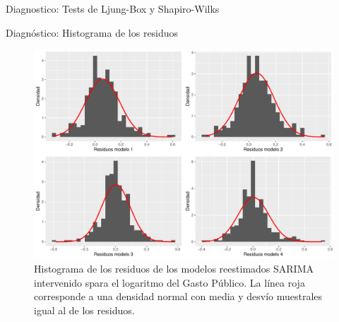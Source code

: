 \documentclass[
  ignorenonframetext,
]{beamer}
\begin{document}
\begin{frame}{Diagnostico: Tests de Ljung-Box y Shapiro-Wilks}
\protect\hypertarget{diagnostico-tests-de-ljung-box-y-shapiro-wilks}{}
\begin{table}[H]
\centering
{}
\caption{Diagnosticos de modelos SARIMA.}
\label{tab:diagnostico2}
\end{table}
\end{frame}

\begin{frame}{Diagnóstico: Histograma de los residuos}
\protect\hypertarget{diagnuxf3stico-histograma-de-los-residuos}{}
\begin{figure}[H]

{\centering \includegraphics[width=0.8\linewidth]{presentacion_files/figure-beamer/unnamed-chunk-19-1} 

}

\caption{\label{norms} Histograma de los residuos de los modelos reestimados SARIMA intervenido spara el logaritmo del Gasto Público. La línea roja corresponde a una densidad normal con media y desvío muestrales igual al de los residuos.}\label{fig:unnamed-chunk-19}
\end{figure}
\end{frame}
\end{document}
